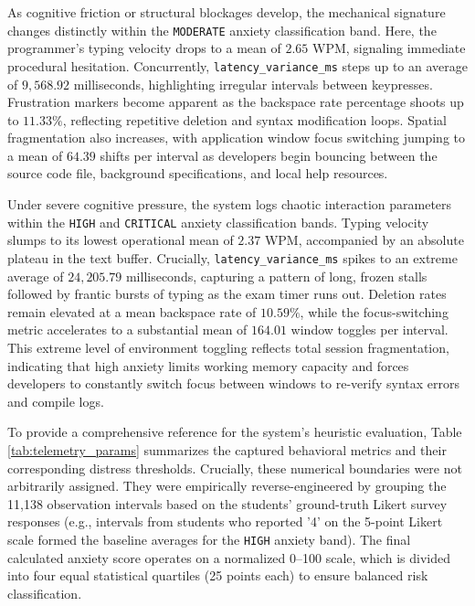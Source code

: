\noindent As cognitive friction or structural blockages develop, the mechanical signature changes distinctly within the \texttt{MODERATE} anxiety classification band. Here, the programmer's typing velocity drops to a mean of $2.65$ WPM, signaling immediate procedural hesitation. Concurrently, \texttt{latency\_variance\_ms} steps up to an average of $9,568.92$ milliseconds, highlighting irregular intervals between keypresses. Frustration markers become apparent as the backspace rate percentage shoots up to $11.33\%$, reflecting repetitive deletion and syntax modification loops. Spatial fragmentation also increases, with application window focus switching jumping to a mean of $64.39$ shifts per interval as developers begin bouncing between the source code file, background specifications, and local help resources.

\noindent Under severe cognitive pressure, the system logs chaotic interaction parameters within the \texttt{HIGH} and \texttt{CRITICAL} anxiety classification bands. Typing velocity slumps to its lowest operational mean of $2.37$ WPM, accompanied by an absolute plateau in the text buffer. Crucially, \texttt{latency\_variance\_ms} spikes to an extreme average of $24,205.79$ milliseconds, capturing a pattern of long, frozen stalls followed by frantic bursts of typing as the exam timer runs out. Deletion rates remain elevated at a mean backspace rate of $10.59\%$, while the focus-switching metric accelerates to a substantial mean of $164.01$ window toggles per interval. This extreme level of environment toggling reflects total session fragmentation, indicating that high anxiety limits working memory capacity and forces developers to constantly switch focus between windows to re-verify syntax errors and compile logs.

\noindent To provide a comprehensive reference for the system’s heuristic evaluation, Table \ref{tab:telemetry_params} summarizes the captured behavioral metrics and their corresponding distress thresholds. Crucially, these numerical boundaries were not arbitrarily assigned. They were empirically reverse-engineered by grouping the 11,138 observation intervals based on the students' ground-truth Likert survey responses (e.g., intervals from students who reported '4' on the 5-point Likert scale formed the baseline averages for the \texttt{HIGH} anxiety band). The final calculated anxiety score operates on a normalized 0--100 scale, which is divided into four equal statistical quartiles (25 points each) to ensure balanced risk classification.

